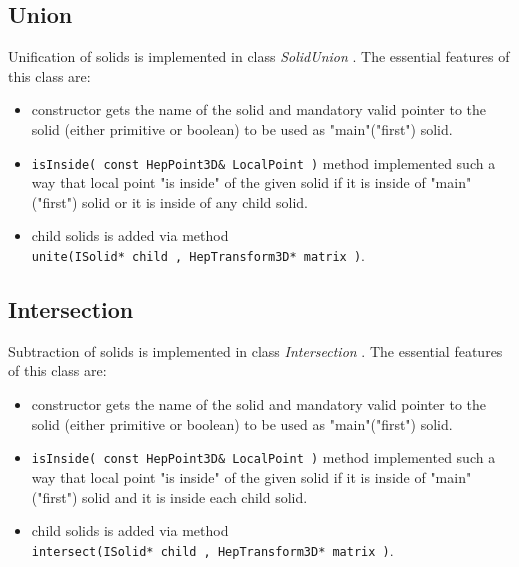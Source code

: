  \subsection { Union } 
Unification of solids is implemented in class {\it SolidUnion }. 
The essential features of this class are:
\begin{itemize}
 \item constructor gets the name of the solid and mandatory valid pointer to the solid (either primitive or boolean)
to be used as "main"("first") solid. 
 \item \verb+isInside( const HepPoint3D& LocalPoint )+ method implemented such a way 
that local point "is inside" of the given solid if it is inside of "main"("first")  solid or  it is inside 
of any child solid. 
\item child solids is added via method \\ \verb+unite(ISolid* child , HepTransform3D* matrix )+. 
\end{itemize}   

 \subsection { Intersection } 
Subtraction of solids is implemented in class {\it Intersection }. 
The essential features of this class are:
\begin{itemize}
 \item constructor gets the name of the solid and mandatory valid pointer to the solid (either primitive or boolean)
to be used as "main"("first") solid. 
 \item \verb+isInside( const HepPoint3D& LocalPoint )+ method implemented such a way 
that local point "is inside" of the given solid if it is inside of "main"("first")  solid and it is inside 
each  child solid. 
\item child solids is added via method \\ \verb+intersect(ISolid* child , HepTransform3D* matrix )+.
\end{itemize}   

 